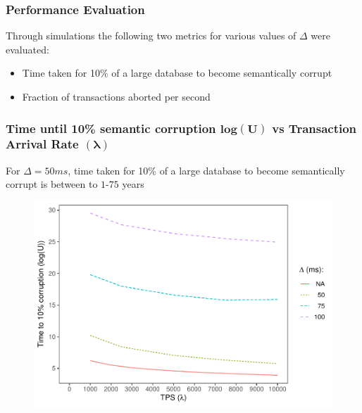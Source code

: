 \begin{frame}
  \frametitle{Performance Evaluation}
 Through simulations the following two metrics for various values of $\Delta$ were evaluated:
  \begin{itemize}
  \item Time taken for 10\% of a large database to become semantically corrupt
    \item Fraction of transactions aborted per second
  \end{itemize}
\end{frame}

\begin{frame}
  \frametitle{Time until 10\% semantic corruption $\boldsymbol{log(U)}$ vs Transaction Arrival Rate $(\boldsymbol{\lambda})$}
  \begin{center}
    For $\Delta = 50ms$, time taken for 10\% of a large database to become semantically corrupt is between to $1$-$75$ years
  \end{center}
    \begin{figure}[h!]
    \centering
    \includegraphics[scale=0.5]{./figures/delta}
  \end{figure}
\end{frame}

